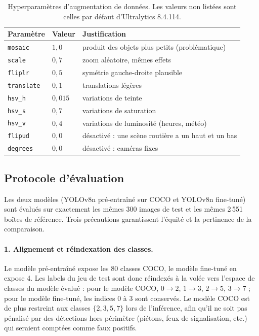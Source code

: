 \begin{table}[tb]
  \centering
  \caption{Hyperparamètres d'augmentation de données. Les valeurs non
  listées sont celles par défaut d'Ultralytics 8.4.114.}
  \label{tab-hyperparams}
  \begin{tabular}{lll}
    \toprule
    Paramètre & Valeur & Justification \\
    \midrule
    \texttt{mosaic}    & $1{,}0$   & produit des objets plus petits (problématique) \\
    \texttt{scale}     & $0{,}7$   & zoom aléatoire, mêmes effets \\
    \texttt{fliplr}    & $0{,}5$   & symétrie gauche-droite plausible \\
    \texttt{translate} & $0{,}1$   & translations légères \\
    \texttt{hsv\_h}    & $0{,}015$ & variations de teinte \\
    \texttt{hsv\_s}    & $0{,}7$   & variations de saturation \\
    \texttt{hsv\_v}    & $0{,}4$   & variations de luminosité (heures, météo) \\
    \texttt{flipud}    & $0{,}0$   & désactivé : une scène routière a un haut et un bas \\
    \texttt{degrees}   & $0{,}0$   & désactivé : caméras fixes \\
    \bottomrule
  \end{tabular}
\end{table}

\subsection{Protocole d'évaluation}\label{sec-protocole}

Les deux modèles (YOLOv8n pré-entraîné sur COCO et YOLOv8n fine-tuné)
sont évalués sur exactement les mêmes 300 images de test et les mêmes
2\,551 boîtes de référence. Trois précautions garantissent l'équité et la
pertinence de la comparaison.

\paragraph{1. Alignement et réindexation des classes.}
Le modèle pré-entraîné expose les 80 classes COCO, le modèle fine-tuné
en expose 4. Les labels du jeu de test sont donc réindexés à la volée
vers l'espace de classes du modèle évalué : pour le modèle COCO,
$0 \rightarrow 2$, $1 \rightarrow 3$, $2 \rightarrow 5$,
$3 \rightarrow 7$ ; pour le modèle fine-tuné, les indices $0$ à $3$ sont
conservés. Le modèle COCO est de plus restreint aux classes
$\{2, 3, 5, 7\}$ lors de l'inférence, afin qu'il ne soit pas pénalisé
par des détections hors périmètre (piétons, feux de signalisation, etc.)
qui seraient comptées comme faux positifs.

